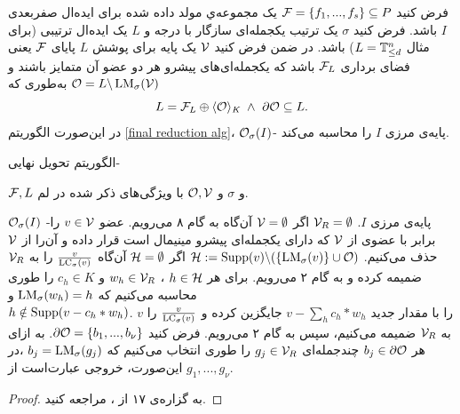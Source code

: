 \begin{proposition}
\label{final reduction th}
فرض کنید 
${\mathcal F} = \{f_{1},...,f_{s}\}\subseteq P$
یک مجموعه‌ي مولد داده شده برای ایده‌ال صفربعدی 
$I$
باشد. فرض کنید 
$\sigma$
یک ترتیب یکجمله‌ای سازگار با درجه و 
$L$
یک ایده‌ال ترتیبی (برای مثال 
$L = {\mathbb{T}}^{n}_{\leq d}$)
باشد. در ضمن فرض کنید 
${\mathcal V}$
یک پایه‌ برای پوشش 
$L$
پایای 
${\mathcal F}$
یعنی فضای برداری
${\mathcal F}_{L}$
باشد که یکجمله‌ای‌های پیشرو هر دو عضو آن متمایز باشند و 
${\mathcal O} = L\backslash \operatorname{\mathrm{LM}}_{\sigma}({\mathcal V})$
به‌طوری که
$$L = {\mathcal F}_{L}\oplus \langle {\mathcal O}\rangle_{\textit{K}} \ \wedge \ \partial\mathcal{O}\subseteq L.$$
در این‌صورت الگوریتم 
\ref{final reduction alg}، 
${\mathcal O}_{\sigma}(I)$-
پایه‌ی مرزی 
$I$
را محاسبه می‌کند. 
\begin{algorithm}[]
	\renewcommand{\algorithmicrequire}{\textbf{ورودی}}
	\renewcommand{\algorithmicensure}{\textbf{خروجی}}
	\caption{الگوریتم تحویل نهایی- }
	\label{final reduction alg}
	\begin{algorithmic}[1]		
		\REQUIRE ${\mathcal F}, L$
		و
		$\sigma$
		و
		${\mathcal O}, {\mathcal V}$
		با ویژگی‌های ذکر شده در لم.
		
		\ENSURE ${\mathcal O}_{\sigma}(I)$
		-پایه‌ی مرزی 
		$I$.
		\STATE ${\mathcal V}_{R} = \emptyset$
		\STATE اگر 
		${\mathcal V} = \emptyset$
		آن‌گاه به گام ۸ می‌رویم.
		\STATE عضو 
		$v\in {\mathcal V}$
		را برابر با عضوی از 
		${\mathcal V}$
		 که دارای یکجمله‌ای پیشرو مینیمال است قرار داده و آن‌را از 
		 ${\mathcal V}$
		 حذف می‌کنیم.
		 \STATE ${\mathcal H}:= \operatorname{\mathrm{Supp}}(v)\backslash (\{\operatorname{\mathrm{LM}}_{\sigma}(v)\}\cup {\mathcal O})$		 
		 \STATE اگر 
		 ${\mathcal H} = \emptyset$
		 آن‌گاه 
		 $\frac{v}{\operatorname{\mathrm{LC}}_{\sigma}(v)}$
		 را به 
		 ${\mathcal V}_{R}$
		 ضمیمه کرده و به گام ۲ می‌رویم.
		 \STATE برای هر 
		 $h\in{\mathcal H}$
		 ، 
		 $w_{h}\in {\mathcal V}_{R}$
		 و
		 $c_{h}\in K$
		 را طوری محاسبه می‌کنیم که 
		 $\operatorname{\mathrm{LM}}_{\sigma}(w_{h}) = h$
		 و\\
		 {\small $h\notin \operatorname{\mathrm{Supp}}(v - c_{h}*w_{h})$}.
		 \STATE $v$		 
		 را با مقدار جدید 
		 $v - \sum_{h}c_{h}*w_{h}$
		 جایگزین کرده و 
		 $\frac{v}{\operatorname{\mathrm{LC}}_{\sigma}(v)}$
		 را به 
		 ${\mathcal V}_{R}$
		 ضمیمه می‌کنیم، سپس به گام ۲ می‌رویم.
		 \STATE فرض کنید 
		 $\partial\mathcal{O} = \{b_{1},...,b_{\nu}\}$.
		 به ازای هر 
		 $b_{j}\in\partial\mathcal{O}$
		 چندجمله‌ای 
		 $g_{j}\in{\mathcal V}_{R}$
		 را طوری انتخاب می‌کنیم که 
		 $b_{j} = \operatorname{\mathrm{LM}}_{\sigma}(g_{j})$
		،در این‌صورت، خروجی عبارت‌است از 
		 $g_{1},...,g_{\nu}$.
	\end{algorithmic}
\end{algorithm}
\end{proposition}
\begin{proof}
به گزاره‌ی ۱۷ از 
{\small \cite{kehrein2006computing}}
، مراجعه کنید.
\end{proof}

